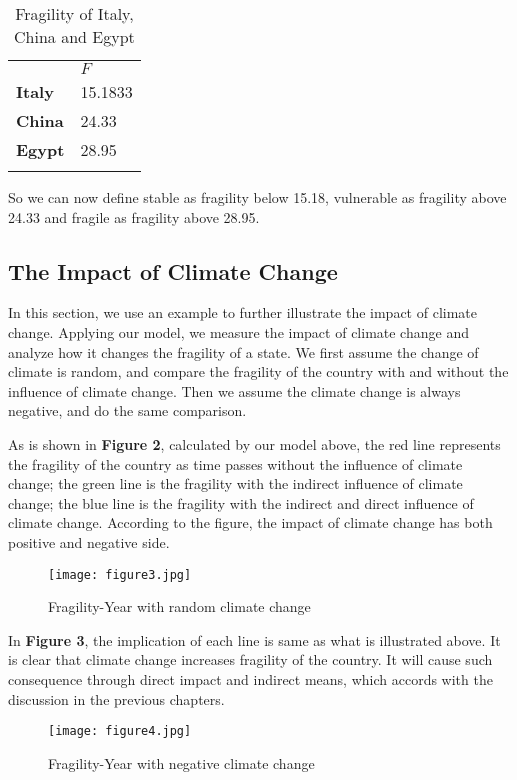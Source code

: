 \documentclass{mcmthesis}
\newlength\savedwidth
\newcommand\whline{\noalign{\global\savedwidth\arrayrulewidth
		\global\arrayrulewidth 1.2pt}%
	\hline
	\noalign{\global\arrayrulewidth\savedwidth}}
\newlength\savewidth
\newcommand\shline{\noalign{\global\savewidth\arrayrulewidth
		\global\arrayrulewidth 1.2pt}%
	\hline
	\noalign{\global\arrayrulewidth\savewidth}}
\begin{document}
	\begin{table}[htbp]
		\renewcommand\arraystretch{1.5}
		\footnotesize
		\centering
		\begin{tabular}{m{2cm}<{\centering}|m{5cm}<{\centering}}
			\whline
			&\textbf{$F$}\\
			\whline
			\textbf{Italy} & 15.1833\\
			
			\textbf{China} & 24.33\\
			
			\textbf{Egypt} & 28.95\\
			
			\shline
		\end{tabular}
		\caption{Fragility of Italy, China and Egypt}\label{tab:Fragility  of Italy, China and Egypt}
	\end{table}
	
	So we can now define stable as fragility below 15.18, vulnerable as fragility above 24.33 and fragile as fragility above 28.95.
	
	\subsection{The Impact of Climate Change}
	
	In this section, we use an example to further illustrate the impact of climate change. Applying our model, we measure the impact of climate change and analyze how it changes the fragility of a state. We first assume the change of climate is random, and compare the fragility of the country with and without the influence of climate change. Then we assume the climate change is always negative, and do the same comparison.
	
	As is shown in \textbf{Figure 2},  calculated by our model above, the red line represents the fragility of the country as time passes without the influence of climate change; the green line is the fragility with the indirect influence of climate change; the blue line is the fragility with the indirect and direct influence of climate change. According to the figure, the impact of climate change has both positive and negative side. 
	\begin{figure}[h]
		\small
		\centering
		\texttt{[image: figure3.jpg]}
		\caption{Fragility-Year with random climate change} \label{fig:Fragility-Year with random climate change}
	\end{figure}

	In \textbf{Figure 3}, the implication of each line is same as what is illustrated above. It is clear that climate change increases fragility of the country. It will cause such consequence through direct impact and indirect means, which accords with the discussion in the previous chapters.
	\begin{figure}[h]
		\small
		\centering
		\texttt{[image: figure4.jpg]}
		\caption{Fragility-Year with negative climate change} \label{fig:Fragility-Year with random climate change}
	\end{figure}
	
\end{document}
